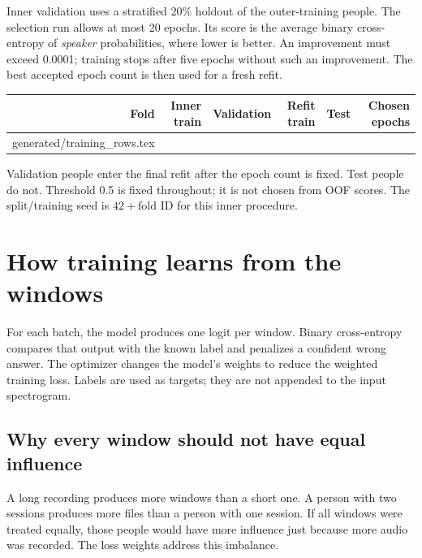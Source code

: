 \documentclass[11pt,a4paper]{article}
\makeatletter
\newcommand{\tableinput}[1]{\@@input #1 }
\makeatother
\begin{document}
Inner validation uses a stratified 20\% holdout of the outer-training people.
The selection run allows at most 20 epochs. Its score is the average binary
cross-entropy of \emph{speaker} probabilities, where lower is better. An
improvement must exceed 0.0001; training stops after five epochs without such an
improvement. The best accepted epoch count is then used for a fresh refit.

\begin{center}\small
\begin{tabular}{@{}rrrrrr@{}}
\toprule
Fold & Inner train & Validation & Refit train & Test & Chosen epochs\\
\midrule
\tableinput{generated/training_rows.tex}
\bottomrule
\end{tabular}
\end{center}

Validation people enter the final refit after the epoch count is fixed. Test
people do not. Threshold 0.5 is fixed throughout; it is not chosen from OOF scores.
The split/training seed is $42+\text{fold ID}$ for this inner procedure.

\clearpage
\section{How training learns from the windows}
For each batch, the model produces one logit per window. Binary cross-entropy
compares that output with the known label and penalizes a confident wrong answer.
The optimizer changes the model's weights to reduce the weighted training loss.
Labels are used as targets; they are not appended to the input spectrogram.

\subsection*{Why every window should not have equal influence}
A long recording produces more windows than a short one. A person with two
sessions produces more files than a person with one session. If all windows
were treated equally, those people would have more influence just because more
audio was recorded. The loss weights address this imbalance.
\end{document}
